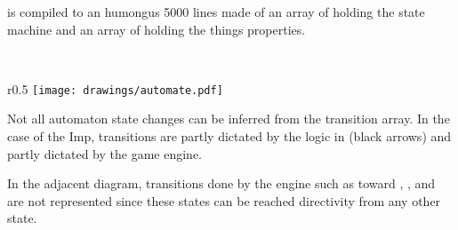  is compiled to an humongus 5000 lines  made of an array of  holding the state machine and an array of  holding the things properties.\\
\par
{}\\
\par
\begin{wrapfigure}[9]{r}{0.5\textwidth}
\centering
\texttt{[image: drawings/automate.pdf]}
\end{wrapfigure}
Not all automaton state changes can be inferred from the transition array. In the case of the Imp, transitions are partly dictated by the logic in  (black arrows) and partly dictated by the game engine.\\
\par
 In the adjacent diagram, transitions done by the engine such as toward , , and  are not represented since these states can be reached directivity from any other state.
\par

\pagebreak

